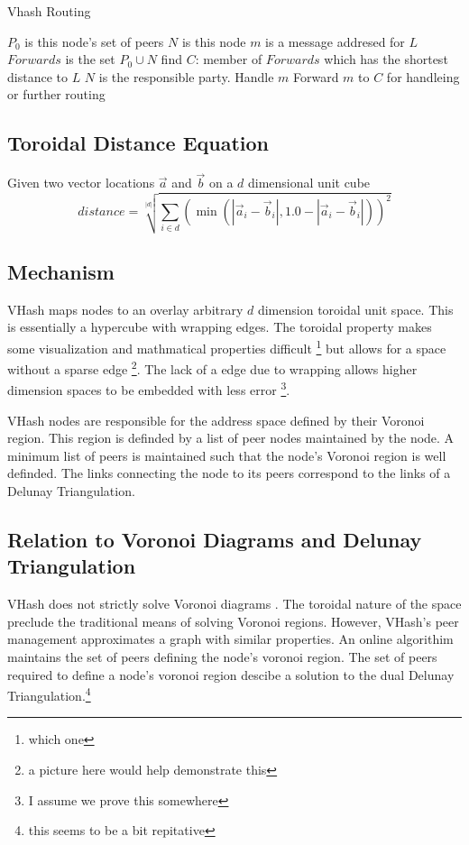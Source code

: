 \documentclass[11pt]{IEEEtran} %
\begin{document}
\begin{algorithm}
\caption{Vhash Routing}
\label{routing}
\begin{algorithmic}[1]  %
	\STATE $P_0$ is this node's set of peers
    \STATE $N$ is this node
	\STATE $m$ is a message addresed for $L$
    \STATE $Forwards$ is the set $P_0\cup{}N$
    \STATE find $C$: member of $Forwards$ which has the shortest distance to $L$
    	\STATE $N$ is the responsible party.
        \STATE Handle $m$
    \ELSE
    	\STATE Forward $m$ to $C$ for handleing or further routing
    \ENDIF
\end{algorithmic}
\end{algorithm}

\subsection{Toroidal Distance Equation}

Given two vector locations $\vec{a}$ and $\vec{b}$ on a  $d$ dimensional unit cube
\[ distance = \sqrt[|d|]{\sum\limits_{i\in d} (\min(|\vec{a}_i-\vec{b}_i|,1.0-|\vec{a}_i-\vec{b}_i|))^2}\]

\subsection{Mechanism}
VHash maps nodes to an overlay arbitrary $d$ dimension toroidal unit space. This is essentially a hypercube with wrapping edges. The toroidal property makes some visualization and mathmatical properties difficult \footnote{which one} but allows for a space without a sparse edge  \footnote{a picture here would help demonstrate this}.  The lack of a edge due to wrapping allows higher dimension spaces to be embedded with less error \footnote{I assume we prove this somewhere}.

VHash nodes are responsible for the address space defined by their Voronoi region. This region is definded by a list of peer nodes maintained by the node. A minimum list of peers is maintained such that the node's Voronoi region is well definded. The links connecting the node to its peers correspond to the links of a Delunay Triangulation. 

\subsection{Relation to Voronoi Diagrams and Delunay Triangulation}

VHash does not strictly solve Voronoi diagrams \cite{voronoi}. The toroidal nature of the space preclude the traditional means of solving Voronoi regions. However, VHash's peer management approximates a graph with similar properties. 
An online algorithim maintains the set of peers defining the node's voronoi region. The set of peers required to define a node's voronoi region descibe a solution to the dual Delunay Triangulation.\footnote{this seems to be a bit repitative}
\end{document}
